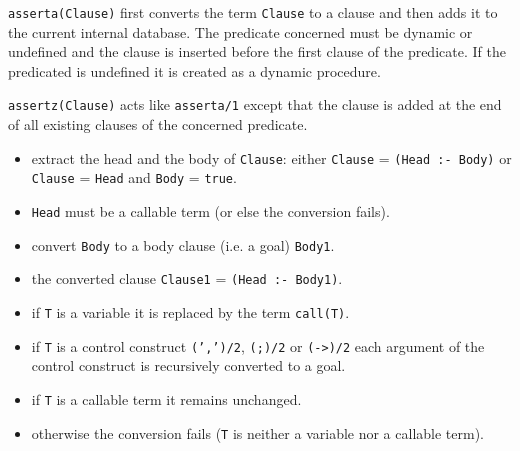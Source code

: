 \Description

\texttt{asserta(Clause)} first converts the term \texttt{Clause} to a clause
and then adds it to the current internal database. The predicate concerned
must be dynamic  or
undefined and the clause is inserted before the first clause of the
predicate. If the predicated is undefined it is created as a dynamic
procedure.

\texttt{assertz(Clause)} acts like \texttt{asserta/1} except that the clause
is added at the end of all existing clauses of the concerned predicate.


\begin{itemize}

\item extract the head and the body of \texttt{Clause}: either
\texttt{Clause} = \texttt{(Head :- Body)} or \texttt{Clause} = \texttt{Head}
and \texttt{Body} = \texttt{true}.

\item \texttt{Head} must be a callable term (or else the conversion fails).

\item convert \texttt{Body} to a body clause (i.e. a goal) \texttt{Body1}.

\item the converted clause \texttt{Clause1} = \texttt{(Head :- Body1)}.

\end{itemize}


\begin{itemize}

\item if \texttt{T} is a variable it is replaced by the term
\texttt{call(T)}.

\item if \texttt{T} is a control construct \texttt{(',')/2}, \texttt{(;)/2}
or \texttt{(->)/2} each argument of the control construct is recursively
converted to a goal.

\item if \texttt{T} is a callable term it remains unchanged.

\item otherwise the conversion fails (\texttt{T} is neither a variable nor a
callable term).

\end{itemize}

